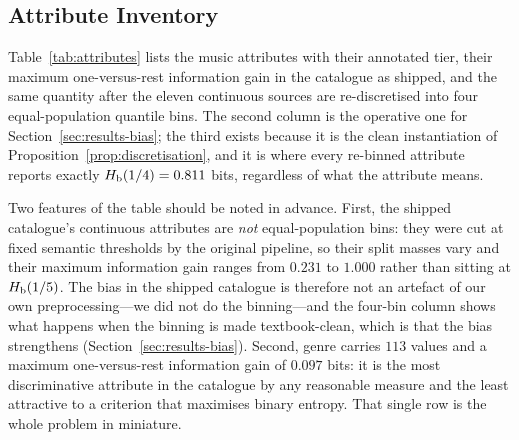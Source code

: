 \subsection{Attribute Inventory}
\label{sec:attributes}

Table~\ref{tab:attributes} lists the music attributes with their annotated
tier, their maximum one-versus-rest information gain in the catalogue as
shipped, and the same quantity after the eleven continuous sources are
re-discretised into four equal-population quantile bins. The second column is
the operative one for Section~\ref{sec:results-bias}; the third exists because
it is the clean instantiation of Proposition~\ref{prop:discretisation}, and it
is where every re-binned attribute reports exactly $H_{\mathrm{b}}(1/4)=0.811$ bits,
regardless of what the attribute means.

Two features of the table should be noted in advance. First, the shipped
catalogue's continuous attributes are \emph{not} equal-population bins: they
were cut at fixed semantic thresholds by the original pipeline, so their split
masses vary and their maximum information gain ranges from $0.231$ to $1.000$
rather than sitting at $H_{\mathrm{b}}(1/5)$. The bias in the shipped catalogue is
therefore not an artefact of our own preprocessing---we did not do the
binning---and the four-bin column shows what happens when the binning is made
textbook-clean, which is that the bias strengthens
(Section~\ref{sec:results-bias}). Second, genre carries $113$ values and a
maximum one-versus-rest information gain of $0.097$ bits: it is the most
discriminative attribute in the catalogue by any reasonable measure and the
least attractive to a criterion that maximises binary entropy. That single row
is the whole problem in miniature.

